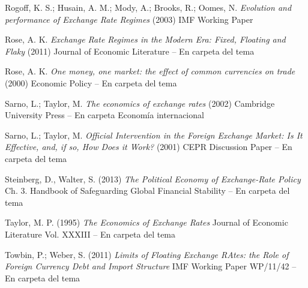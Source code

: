\documentclass{nuevotema}
\begin{document}
Rogoff, K. S.; Husain, A. M.; Mody, A.; Brooks, R.; Oomes, N. \textit{Evolution and performance of Exchange Rate Regimes} (2003) IMF Working Paper

Rose, A. K. \textit{Exchange Rate Regimes in the Modern Era: Fixed, Floating and Flaky} (2011) Journal of Economic Literature -- En carpeta del tema

Rose, A. K. \textit{One money, one market: the effect of common currencies on trade} (2000) Economic Policy -- En carpeta del tema

Sarno, L.; Taylor, M. \textit{The economics of exchange rates} (2002) Cambridge University Press -- En carpeta Economía internacional

Sarno, L.; Taylor, M. \textit{Official Intervention in the Foreign Exchange Market: Is It Effective, and, if so, How Does it Work?} (2001) CEPR Discussion Paper -- En carpeta del tema

Steinberg, D., Walter, S. (2013) \textit{The Political Economy of Exchange-Rate Policy} Ch. 3. Handbook of Safeguarding Global Financial Stability -- En carpeta del tema

Taylor, M. P. (1995) \textit{The Economics of Exchange Rates} Journal of Economic Literature Vol. XXXIII -- En carpeta del tema

Towbin, P.; Weber, S. (2011) \textit{Limits of Floating Exchange RAtes: the Role of Foreign Currency Debt and Import Structure} IMF Working Paper WP/11/42 -- En carpeta del tema
\end{document}
